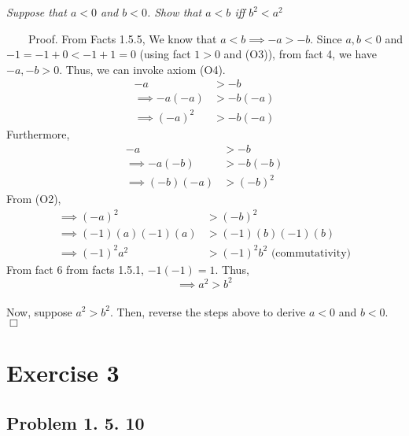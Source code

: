 \documentclass[
]{article}
\begin{document}
\emph{Suppose that \(a < 0\) and \(b < 0\). Show that \(a < b\) iff
\(b^2 < a^2\)}

~~~~Proof. From Facts 1.5.5, We know that \(a < b \implies -a > -b\).
Since \(a, b < 0\) and \(-1= -1 + 0 < -1 + 1= 0\) (using fact \(1 >0\)
and (O3)), from fact 4, we have \(-a, -b > 0\). Thus, we can invoke
axiom (O4).
\[\begin{aligned} -a &> -b \\ \implies -a(-a) &> -b(-a) \\ \implies (-a)^2 &> -b(-a)\end{aligned} \]
Furthermore,
\[\begin{aligned} -a &> -b \\ \implies -a(-b) &> -b(-b) \\ \implies (-b)(-a) &> (-b)^2\end{aligned} \]
From (O2),
\[\begin{aligned} \implies (-a)^2 &> (-b)^2 \\ \implies (-1)(a)(-1)(a) &> (-1)(b)(-1)(b) \\ \implies (-1)^2 a^2 &> (-1)^2 b^2 \text{ (commutativity)} \end{aligned}\]
From fact 6 from facts 1.5.1, \(-1(-1) = 1\). Thus,
\[\implies a^2 > b^2\]\\
Now, suppose \(a^2 > b^2\). Then, reverse the steps above to derive
\(a < 0\) and \(b < 0\). \hfill \(\Box\)

\hypertarget{exercise-3}{%
\section{Exercise 3}\label{exercise-3}}

\hypertarget{problem-1.-5.-10}{%
\subsection{Problem 1. 5. 10}\label{problem-1.-5.-10}}
\end{document}

